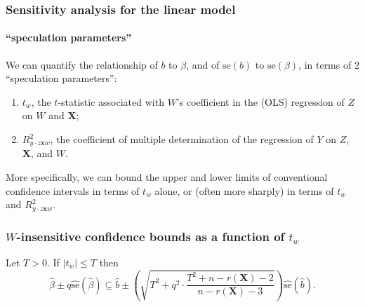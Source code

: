  
\begin{frame}
  \frametitle{Sensitivity analysis for the linear model}
\framesubtitle{``speculation parameters''}

We can quantify the relationship of $b$ to $\beta$, and of $\mathrm{se}(b)$ to
$\mathrm{se}(\beta)$, in terms of 2 ``speculation parameters'':
\begin{enumerate}
\item $t_{w}$, the $t$-statistic associated with $W$'s coefficient in the (OLS) regression of $Z$ on $W$ and $\mathbf{X}$;
\item $R^2_{y\cdot z\mathbf{x} w}$, the
coefficient of multiple determination of the regression of $Y$ on $Z$,
$\mathbf{X}$, and $W$.
\end{enumerate}

More specifically, we can bound the upper and lower limits of conventional confidence intervals in terms of $t_{w}$ alone, or (often more sharply) in terms of $t_{w}$ and $R^2_{y\cdot z\mathbf{x} w}$.
\end{frame}
\begin{frame}
  \frametitle{$W$-insensitive confidence bounds as a function of $t_{w}$}

  \begin{prop}
Let $T>0$.  If $|t_{w}| \leq T$ then 
$$
\hat{\beta}\pm q\widehat{\mathrm{se}} (\hat{\beta}) \subseteq 
\hat{b} \pm \left( \sqrt{T^2 + q^{2} \cdot \frac{T^2 + 
n-r(\mathbf{X})-2}{n-r(\mathbf{X})-3} } \right) \widehat{\mathrm{se}}(\hat{b}).
$$
\end{prop}
\end{frame}


